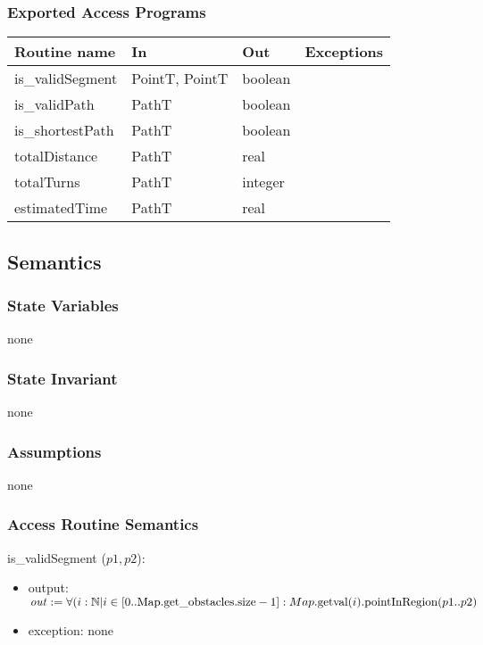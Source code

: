 \documentclass[12pt]{article}
\begin{document}
\subsubsection* {Exported Access Programs}
\begin{tabular}{| l | l | l | l |}
\hline
\textbf{Routine name} & \textbf{In} & \textbf{Out} & \textbf{Exceptions}\\
\hline
is\_validSegment & PointT, PointT & boolean & ~\\
\hline
is\_validPath & PathT & boolean & ~\\
\hline
is\_shortestPath & PathT & boolean & ~\\
\hline
totalDistance & PathT & real & ~\\
\hline
totalTurns & PathT & integer & ~\\
\hline
estimatedTime & PathT & real & ~\\
\hline
\end{tabular}
\subsection* {Semantics}
\subsubsection*{State Variables}
none
\subsubsection* {State Invariant}
none
\subsubsection* {Assumptions}
none
\subsubsection* {Access Routine Semantics}

\noindent  is\_validSegment ($p1, p2$):
\begin{itemize}
\item output: $\mathit{out} := \forall(i : \mathbb{N} | i \in [0 .. \mbox{Map.\mbox{get\_obstacles}.\mbox{size}} - 1] : Map.\mbox{getval}(i).\mbox{pointInRegion}(p1..p2)$
\item exception: none
\end{itemize}
\end{document}
